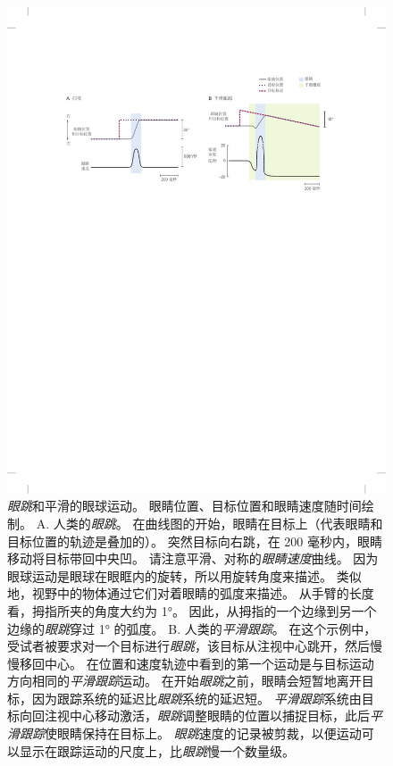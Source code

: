 \begin{figure}[htbp]
	\centering
	\includegraphics[width=1.0\linewidth]{chap35/fig_35_6}
	\caption{\textit{眼跳}和平滑的眼球运动。
		眼睛位置、目标位置和眼睛速度随时间绘制。
		A. 人类的\textit{眼跳}。
		在曲线图的开始，眼睛在目标上（代表眼睛和目标位置的轨迹是叠加的）。
		突然目标向右跳，在 200 毫秒内，眼睛移动将目标带回中央凹。
		请注意平滑、对称的\textit{眼睛速度}曲线。
		因为眼球运动是眼球在眼眶内的旋转，所以用旋转角度来描述。
		类似地，视野中的物体通过它们对着眼睛的弧度来描述。
		从手臂的长度看，拇指所夹的角度大约为 1°。
		因此，从拇指的一个边缘到另一个边缘的\textit{眼跳}穿过 1° 的弧度。
		B. 人类的\textit{平滑跟踪}。
		在这个示例中，受试者被要求对一个目标进行\textit{眼跳}，该目标从注视中心跳开，然后慢慢移回中心。
		在位置和速度轨迹中看到的第一个运动是与目标运动方向相同的\textit{平滑跟踪}运动。
		在开始\textit{眼跳}之前，眼睛会短暂地离开目标，因为跟踪系统的延迟比\textit{眼跳}系统的延迟短。
		\textit{平滑跟踪}系统由目标向回注视中心移动激活，\textit{眼跳}调整眼睛的位置以捕捉目标，此后\textit{平滑跟踪}使眼睛保持在目标上。
		\textit{眼跳}速度的记录被剪裁，以便运动可以显示在跟踪运动的尺度上，比\textit{眼跳}慢一个数量级。}
	\label{fig:35_6}
\end{figure}


